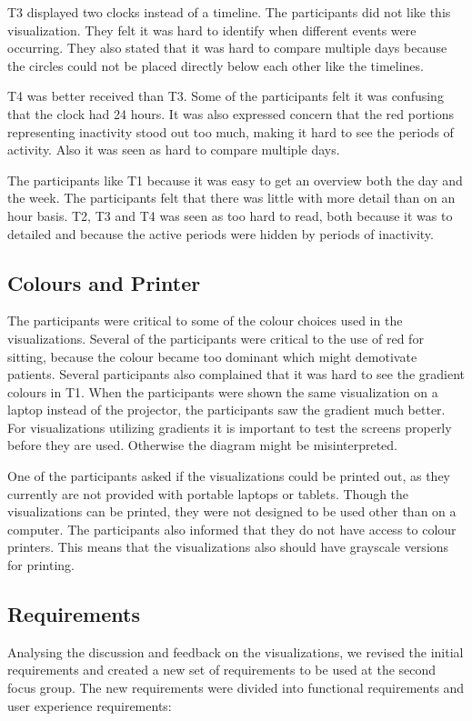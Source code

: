 T3 displayed two clocks instead of a timeline. The participants did not like this visualization. They felt it was hard to identify when different events were occurring. They also stated that it was hard to compare multiple days because the circles could not be placed directly below each other like the timelines.

T4 was better received than T3. Some of the participants felt it was confusing that the clock had 24 hours. It was also expressed concern that the red portions representing inactivity stood out too much, making it hard to see the periods of activity. Also it was seen as hard to compare multiple days.

The participants like T1 because it was easy to get an overview both the day and the week. The participants felt that there was little with more detail than on an hour basis. T2, T3 and T4 was seen as too hard to read, both because it was to detailed and because the active periods were hidden by periods of inactivity.

\subsection{Colours and Printer}
The participants were critical to some of the colour choices used in the visualizations. Several of the participants were critical to the use of red for sitting, because the colour became too dominant which might demotivate patients. Several participants also complained that it was hard to see the gradient colours in T1. When the participants were shown the same visualization on a laptop instead of the projector, the participants saw the gradient much better. For visualizations utilizing gradients it is important to test the screens properly before they are used. Otherwise the diagram might be misinterpreted. 

One of the participants asked if the visualizations could be printed out, as they currently are not provided with portable laptops or tablets. Though the visualizations can be printed, they were not designed to be used other than on a computer. The participants also informed that they do not have access to colour printers. This means that the visualizations also should have grayscale versions for printing. 

\subsection{Requirements}
Analysing the discussion and feedback on the visualizations, we revised the initial requirements and created a new set of requirements to be used at the second focus group. The new requirements were divided into functional requirements and user experience requirements:

